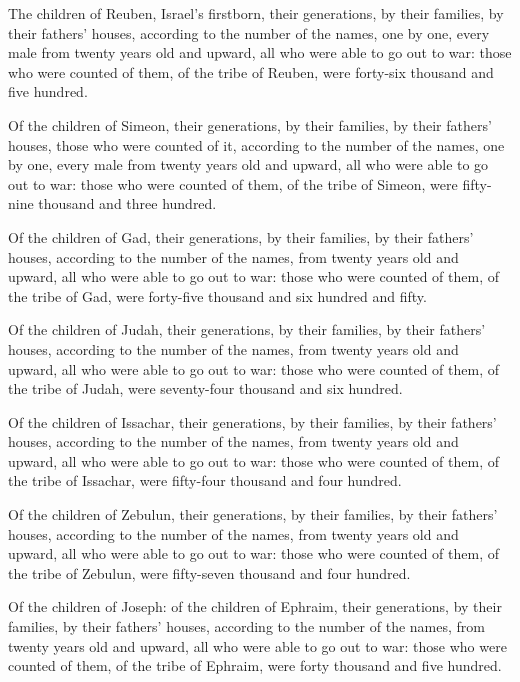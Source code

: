  The children of Reuben, Israel's firstborn, their
generations, by their families, by their fathers' houses, according to
the number of the names, one by one, every male from twenty years old
and upward, all who were able to go out to war:  those who
were counted of them, of the tribe of Reuben, were forty-six thousand
and five hundred.

 Of the children of Simeon, their generations, by their
families, by their fathers' houses, those who were counted of it,
according to the number of the names, one by one, every male from twenty
years old and upward, all who were able to go out to war: 
those who were counted of them, of the tribe of Simeon, were fifty-nine
thousand and three hundred.

 Of the children of Gad, their generations, by their
families, by their fathers' houses, according to the number of the
names, from twenty years old and upward, all who were able to go out to
war:  those who were counted of them, of the tribe of Gad,
were forty-five thousand and six hundred and fifty.

 Of the children of Judah, their generations, by their
families, by their fathers' houses, according to the number of the
names, from twenty years old and upward, all who were able to go out to
war:  those who were counted of them, of the tribe of
Judah, were seventy-four thousand and six hundred.

 Of the children of Issachar, their generations, by their
families, by their fathers' houses, according to the number of the
names, from twenty years old and upward, all who were able to go out to
war:  those who were counted of them, of the tribe of
Issachar, were fifty-four thousand and four hundred.

 Of the children of Zebulun, their generations, by their
families, by their fathers' houses, according to the number of the
names, from twenty years old and upward, all who were able to go out to
war:  those who were counted of them, of the tribe of
Zebulun, were fifty-seven thousand and four hundred.

 Of the children of Joseph: of the children of Ephraim,
their generations, by their families, by their fathers' houses,
according to the number of the names, from twenty years old and upward,
all who were able to go out to war:  those who were counted
of them, of the tribe of Ephraim, were forty thousand and five hundred.

